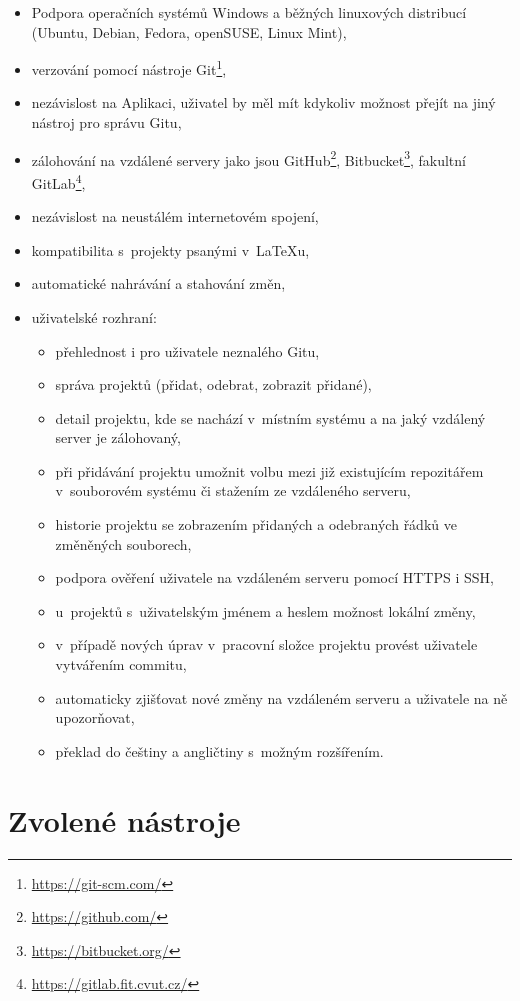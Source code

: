 \begin{itemize}
	\item Podpora operačních systémů Windows a běžných linuxových distribucí (Ubuntu, Debian, Fedora, openSUSE, Linux Mint),
	\item verzování pomocí nástroje Git\footnote{\url{https://git-scm.com/}},
	\item nezávislost na Aplikaci, uživatel by měl mít kdykoliv možnost přejít na jiný nástroj pro správu Gitu,
	\item zálohování na vzdálené servery jako jsou GitHub\footnote{\url{https://github.com/}}, Bitbucket\footnote{\url{https://bitbucket.org/}}, fakultní GitLab\footnote{\url{https://gitlab.fit.cvut.cz/}},
	\item nezávislost na neustálém internetovém spojení,
	\item kompatibilita s~projekty psanými v~\LaTeX{u},
	\item automatické nahrávání a stahování změn,
	\item uživatelské rozhraní:
		\begin{itemize}
			\item přehlednost i pro uživatele neznalého Gitu,
			\item správa projektů (přidat, odebrat, zobrazit přidané),
			\item detail projektu, kde se nachází v~místním systému a na jaký vzdálený server je zálohovaný,
			\item při přidávání projektu umožnit volbu mezi již existujícím repozitářem v~souborovém systému či stažením ze vzdáleného serveru,
			\item historie projektu se zobrazením přidaných a odebraných řádků ve změněných souborech,
			\item podpora ověření uživatele na vzdáleném serveru pomocí HTTPS i SSH,
			\item u~projektů s~uživatelským jménem a heslem možnost lokální změny,
			\item v~případě nových úprav v~pracovní složce projektu provést uživatele vytvářením commitu,
			\item automaticky zjišťovat nové změny na vzdáleném serveru a uživatele na ně upozorňovat,
			\item překlad do češtiny a angličtiny s~možným rozšířením.
		\end{itemize}
\end{itemize}


\section{Zvolené nástroje}

